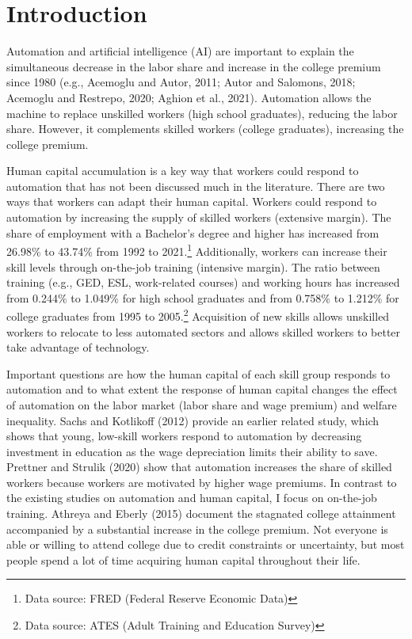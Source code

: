 \documentclass[12pt]{article}
\begin{document}
\section{Introduction}
Automation and artificial intelligence (AI) are important to explain the simultaneous decrease in the labor share and increase in the college premium since 1980 (e.g., Acemoglu and Autor, 2011\nocite{AcemogluAutor2011}; Autor and Salomons, 2018\nocite{AutorSalomons2018}; Acemoglu and Restrepo, 2020\nocite{AcemogluRestrepo2020}; Aghion et al., 2021\nocite{Aghionetal2021}). Automation allows the machine to replace unskilled workers (high school graduates), reducing the labor share. However, it complements skilled workers (college graduates), increasing the college premium. 

Human capital accumulation is a key way that workers could respond to automation that has not been discussed much in the literature. There are two ways that workers can adapt their human capital. Workers could respond to automation by increasing the supply of skilled workers (extensive margin). The share of employment with a Bachelor's degree and higher has increased from 26.98\% to 43.74\% from 1992 to 2021.\footnote{Data source: FRED (Federal Reserve Economic Data)} Additionally, workers can increase their skill levels through on-the-job training (intensive margin). The ratio between training (e.g., GED, ESL, work-related courses) and working hours has increased from 0.244\% to 1.049\% for high school graduates and from 0.758\% to 1.212\% for college graduates from 1995 to 2005.\footnote{Data source: ATES (Adult Training and Education Survey)} Acquisition of new skills allows unskilled workers to relocate to less automated sectors and allows skilled workers to better take advantage of technology. 

Important questions are how the human capital of each skill group responds to automation and to what extent the response of human capital changes the effect of automation on the labor market (labor share and wage premium) and welfare inequality. Sachs and Kotlikoff (2012)\nocite{SachsKotlikoff2012} provide an earlier related study, which shows that young, low-skill workers respond to automation by decreasing investment in education as the wage depreciation limits their ability to save. Prettner and Strulik (2020)\nocite{PrettnerStrulik2020} show that automation increases the share of skilled workers because workers are motivated by higher wage premiums. In contrast to the existing studies on automation and human capital, I focus on on-the-job training. Athreya and Eberly (2015)\nocite{AthreyaEberly2015} document the stagnated college attainment accompanied by a substantial increase in the college premium. Not everyone is able or willing to attend college due to credit constraints or uncertainty, but most people spend a lot of time acquiring human capital throughout their life.
\end{document}
